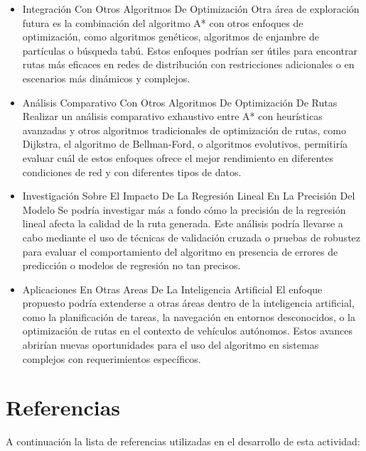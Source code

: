 \documentclass[conference]{IEEEtran}
\begin{document}
\begin{itemize}
	\item Integración Con Otros Algoritmos De Optimización
	Otra área de exploración futura es la combinación del algoritmo A* con otros enfoques de optimización, como algoritmos genéticos, algoritmos de enjambre de partículas o búsqueda tabú. Estos enfoques podrían ser útiles para encontrar rutas más eficaces en redes de distribución con restricciones adicionales o en escenarios más dinámicos y complejos.
	
	\item Análisis Comparativo Con Otros Algoritmos De Optimización De Rutas
	Realizar un análisis comparativo exhaustivo entre A* con heurísticas avanzadas y otros algoritmos tradicionales de optimización de rutas, como Dijkstra, el algoritmo de Bellman-Ford, o algoritmos evolutivos, permitiría evaluar cuál de estos enfoques ofrece el mejor rendimiento en diferentes condiciones de red y con diferentes tipos de datos.
	
	\item Investigación Sobre El Impacto De La Regresión Lineal En La Precisión Del Modelo
	Se podría investigar más a fondo cómo la precisión de la regresión lineal afecta la calidad de la ruta generada. Este análisis podría llevarse a cabo mediante el uso de técnicas de validación cruzada o pruebas de robustez para evaluar el comportamiento del algoritmo en presencia de errores de predicción o modelos de regresión no tan precisos.
	
	\item Aplicaciones En Otras Areas De La Inteligencia Artificial
	El enfoque propuesto podría extenderse a otras áreas dentro de la inteligencia artificial, como la planificación de tareas, la navegación en entornos desconocidos, o la optimización de rutas en el contexto de vehículos autónomos. Estos avances abrirían nuevas oportunidades para el uso del algoritmo en sistemas complejos con requerimientos específicos.
	
	\end{itemize}
	
	\section{Referencias}
	
	A continuación la lista de referencias utilizadas en el desarrollo de esta actividad:
	
\end{document}

